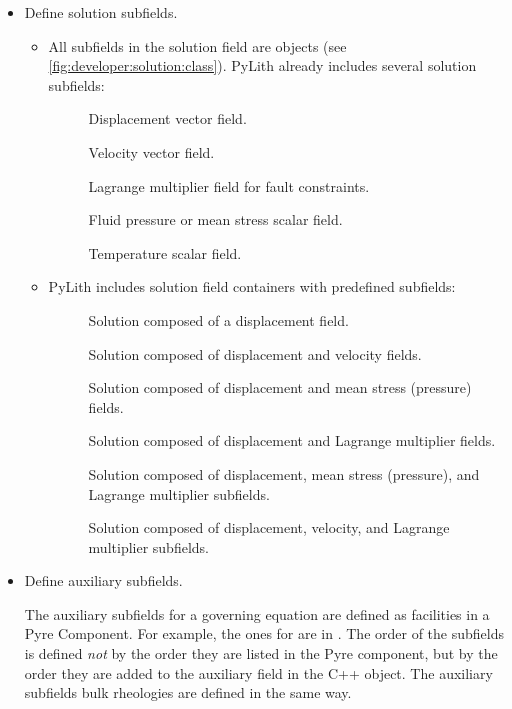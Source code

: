 \begin{itemize}
\item Define solution subfields.

  \begin{itemize}
  \item All subfields in the solution field are
     objects (see
    \vref{fig:developer:solution:class}). PyLith already includes
    several solution subfields:
    \begin{description}
    \item[] Displacement vector field.
    \item[] Velocity vector field.
    \item[] Lagrange multiplier field for
      fault constraints.
    \item[] Fluid pressure or mean stress scalar field.
    \item[] Temperature scalar field.
    \end{description}
  \item PyLith includes solution field containers with predefined
    subfields:
    \begin{description}
    \item[] Solution composed of a displacement field.
    \item[] Solution composed of displacement and velocity fields.
    \item[] Solution composed of displacement and
      mean stress (pressure) fields.
    \item[] Solution composed of displacement
      and Lagrange multiplier fields.
    \item[] Solution composed of
      displacement, mean stress (pressure), and Lagrange multiplier subfields.
    \item[] Solution composed of
      displacement, velocity, and Lagrange multiplier subfields.
    \end{description}
  \end{itemize}
%
\item Define auxiliary subfields.

  The auxiliary subfields for a governing equation are defined as
  facilities in a Pyre Component. For example, the ones for
   are in . The order
  of the subfields is defined {\em not} by the order they are listed
  in the Pyre component, but by the order they are added to the
  auxiliary field in the C++ object. The auxiliary subfields bulk
  rheologies are defined in the same way.


\end{itemize}
